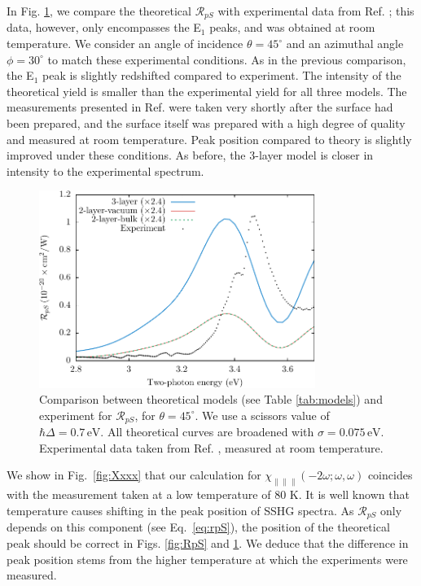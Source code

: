 \documentclass[11pt]{book}
\begin{document}
In Fig. \ref{fig:mitchellRpS}, we compare the theoretical $\mathcal{R}_{pS}$
with experimental data from Ref. \cite{mitchellSS01}; this data, however,
only encompasses the E$_{1}$ peaks, and was obtained at room temperature. We
consider an angle of incidence $\theta=45^\circ$ and an azimuthal angle
$\phi=30^\circ$ to match these experimental conditions. As in the previous
comparison, the E$_{1}$ peak is slightly redshifted compared to experiment. The
intensity of the theoretical yield is smaller than the experimental yield for
all three models. The measurements presented in Ref. \cite{mitchellSS01}
were taken very shortly after the surface had been prepared, and the surface
itself was prepared with a high degree of quality and measured at room
temperature. Peak position compared to theory is slightly improved under these
conditions. As before, the 3-layer model is closer in intensity to
the experimental spectrum.

\begin{figure}
\centering
\includegraphics[width=0.8\textwidth]{../figures/04-results/fig-4_4_02}
\caption{Comparison between theoretical models (see Table
\ref{tab:models}) and experiment for $\mathcal{R}_{pS}$, for $\theta=45^\circ$.
We use a scissors value of $\hbar\Delta = 0.7\,\text{eV}$. All theoretical
curves are broadened with $\sigma=0.075\,\text{eV}$. Experimental data taken
from Ref. \cite{mitchellSS01}, measured at room temperature.}
\label{fig:mitchellRpS}
\end{figure}

We show in Fig.~\ref{fig:Xxxx} that our calculation for
$\chi_{\parallel\parallel\parallel}(-2\omega;\omega,\omega)$ coincides with the
measurement taken at a low temperature of 80 K. It is well known that
temperature causes shifting in the peak position of SSHG
spectra.\cite{dadapPRB97} As $\mathcal{R}_{pS}$ only depends on this component
(see Eq.~\eqref{eq:rpS}), the position of the theoretical peak should be correct
in Figs. \ref{fig:RpS} and \ref{fig:mitchellRpS}. We deduce that the difference
in peak position stems from the higher  temperature at which the experiments
were measured.
\end{document}
